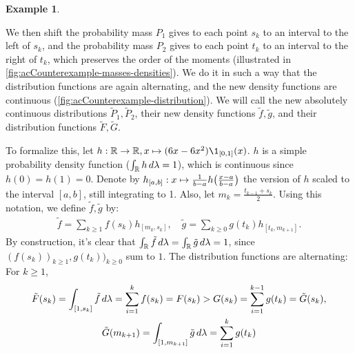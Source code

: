 \documentclass[a4paper]{scrreprt}
\theoremstyle{definition}
\newtheorem{ex}[thm]{Example} %
\begin{document}
\begin{ex}
\begin{enumerate}
            We then shift the probability mass $P_1$ gives to each point $s_k$ to an interval to the left of $s_k$, and the probability mass $P_2$ gives to each point $t_k$ to an interval to the right of $t_k$, which preserves the order of the moments (illustrated in \autoref{fig:acCounterexample-masses-densities}). We do it in such a way that the distribution functions are again alternating, and the new density functions are continuous (\autoref{fig:acCounterexample-distribution}). We will call the new absolutely continuous distributions $\tilde{P}_1, \tilde{P}_2$, their new density functions $\tilde{f}, \tilde{g}$, and their distribution functions $\tilde{F}, \tilde{G}$.
            
            To formalize this, let $h: \R \to \R, x \mapsto (6x - 6x^2)\1_{[0, 1]}(x)$. $h$ is a simple probability density function ($\int_{\mathbb{R}} h \, d\lambda = 1$), which is continuous since $h(0) = h(1) = 0$.
            Denote by $h_{[a, b]}: x \mapsto \frac{1}{b-a}h\bigl(\frac{x-a}{b-a}\bigr)$ the version of $h$ scaled to the interval $[a, b]$, still integrating to 1.
            Also, let $m_{k} = \frac{t_{k-1} + s_k}{2}$.
            Using this notation, we define $\tilde{f}, \tilde{g}$ by:
            \begin{gather}
                \tilde{f} = \sum_{k \geq 1}  f(s_k) h_{[m_k, s_k]}, \quad
                \tilde{g} = \sum_{k \geq 0}  g(t_k) h_{[t_k, m_{k+1}]}.
                \label{eq:acSufficientTailOrderConditionCounterexample-densitiesDefinition}
            \end{gather}
            By construction, it's clear that $\int_{\mathbb{R}} \tilde{f} \, d\lambda = \int_{\mathbb{R}} \tilde{g} \, d\lambda = 1$, since $(f(s_k))_{k \geq 1}, g(t_k))_{k \geq 0}$ sum to $1$. The distribution functions are alternating:
            For $k \geq 1$,
            \begin{gather*}
                \tilde{F}(s_k) 
                = \lintegral{[1, s_k]}{\tilde{f}}{\lambda} 
                = \sum_{i=1}^{k} f(s_k) 
                = F(s_k)
                > G(s_k)
                = \sum_{i=1}^{k-1} g(t_k) 
                = \tilde{G}(s_k)
                ,\\                
                \tilde{G}(m_{k+1})                
                = \lintegral{[1, m_{k+1}]}{\tilde{g}}{\lambda} 
                = \sum_{i=1}^{k} g(t_k)

\end{gather*}
\end{enumerate}
\end{ex}
\end{document}
